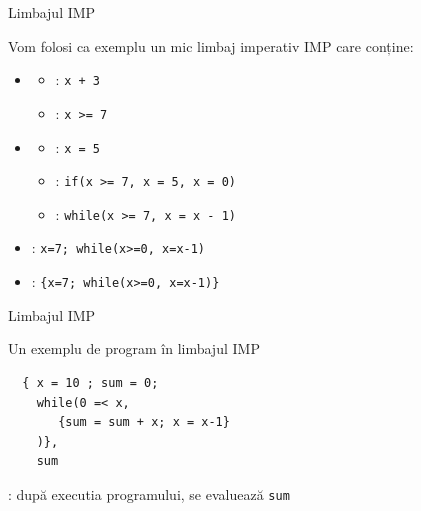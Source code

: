 \documentclass[xcolor=pdftex,romanian,colorlinks]{beamer}
\begin{document}
\begin{frame}{Limbajul IMP}

Vom folosi ca exemplu un mic limbaj imperativ IMP care conține:

\begin{itemize}
\item {}
	\begin{itemize}
		  \item {}: \hspace{.2cm} \texttt{x + 3}
		  \item {}: \hspace{.2cm} \texttt{x >= 7}
	\end{itemize}
 
\item {}
	\begin{itemize}
 		 \item {}: \hspace{.2cm} \texttt{x = 5}
		  
 		 \item {}: \hspace{.2cm} 
 		 \texttt{if(x >= 7, x = 5, x = 0)}
		  
		  \item {}: \hspace{.2cm}
		   \texttt{while(x >= 7, x = x - 1)}
		  \end{itemize}
		   
		  \item {}: \hspace{.2cm}
		  \texttt{x=7; while(x>=0, x=x-1)}
		   
		  \item {}: \hspace{.2cm}
		  \texttt{\{x=7; while(x>=0, x=x-1)\}}
\end{itemize}


\end{frame}

\begin{frame}[fragile]{Limbajul IMP}


Un exemplu de program în limbajul IMP

\begin{verbatim}
  { x = 10 ; sum = 0;
    while(0 =< x,
       {sum = sum + x; x = x-1}
    )},
    sum      
\end{verbatim}


: dup\u{a} executia programului, se evalueaz\u{a}  \texttt{sum} 


\end{frame}
\end{document}
